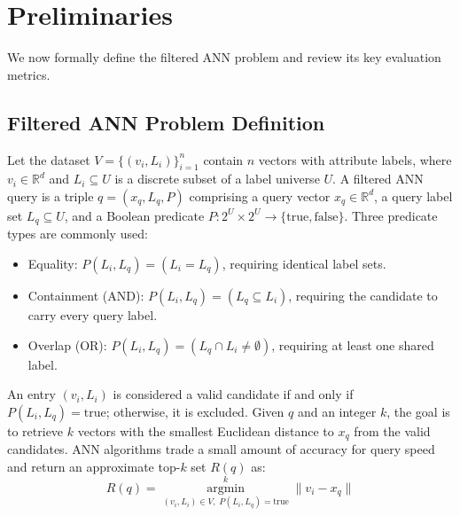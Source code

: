 \section{Preliminaries}
\label{sec:preli}

We now formally define the filtered ANN problem and review its key evaluation metrics.

\subsection{Filtered ANN Problem Definition}
\label{ssec:problem}

Let the dataset $V = \{(v_i, L_i)\}_{i=1}^{n}$ contain $n$ vectors with attribute labels, where $v_i \in \mathbb{R}^d$ and $L_i \subseteq U$ is a discrete subset of a label universe $U$. A filtered ANN query is a triple $q = (x_q, L_q, P)$ comprising a query vector $x_q \in \mathbb{R}^d$, a query label set $L_q \subseteq U$, and a Boolean predicate $P : 2^U \times 2^U \to \{\mathrm{true}, \mathrm{false}\}$. Three predicate types are commonly used:
\begin{itemize}
    \item Equality: $P(L_i, L_q) = (L_i = L_q)$, requiring identical label sets.
    \item Containment (AND): $P(L_i, L_q) = (L_q \subseteq L_i)$, requiring the candidate to carry every query label.
    \item Overlap (OR): $P(L_i, L_q) = (L_q \cap L_i \neq \emptyset)$, requiring at least one shared label.
\end{itemize}

An entry $(v_i, L_i)$ is considered a valid candidate if and only if $P(L_i, L_q) = \mathrm{true}$; otherwise, it is excluded.
Given $q$ and an integer $k$, the goal is to retrieve $k$ vectors with the smallest Euclidean distance to $x_q$ from the valid candidates. ANN algorithms trade a small amount of accuracy for query speed and return an approximate top-$k$ set $R(q)$ as:
\begin{equation}
    R(q)=\mathop{\arg\min}\limits^{k}_{(v_i, L_i) \in V,\; P(L_i, L_q) = \mathrm{true}} \|v_i - x_q\|
\end{equation}



